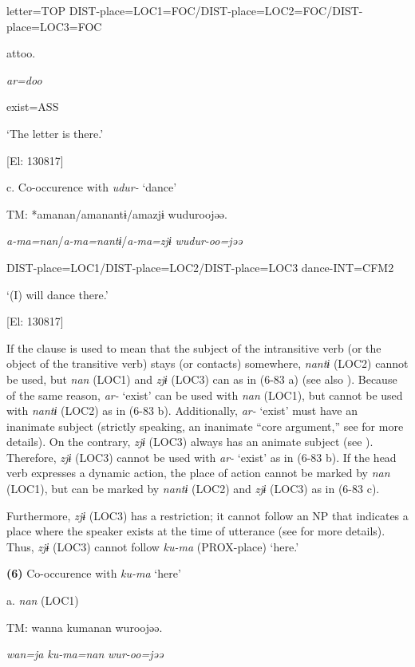     letter=TOP  DIST-place=LOC1=FOC/DIST-place=LOC2=FOC/DIST-place=LOC3=FOC

    attoo.  

    \textit{ar=doo}  

    exist=ASS  

    ‘The letter is there.’

    [El: 130817]

  c. Co-occurence with \textit{udur-} ‘dance’

  TM:  *amanan/amanantɨ/amazjɨ  wuduroojəə.

    \textit{a-ma=nan}/\textit{a-ma=nantɨ}/\textit{a-ma=zjɨ}  \textit{wudur-oo=jəə}

    DIST-place=LOC1/DIST-place=LOC2/DIST-place=LOC3  dance-INT=CFM2

     ‘(I) will dance there.’

    [El: 130817]

If the clause is used to mean that the subject of the intransitive verb (or the object of the transitive verb) stays (or contacts) somewhere, \textit{nantɨ} (LOC2) cannot be used, but \textit{nan} (LOC1) and \textit{zjɨ} (LOC3) can as in (6-83 a) (see also ). Because of the same reason, \textit{ar-} ‘exist’ can be used with \textit{nan} (LOC1), but cannot be used with \textit{nantɨ} (LOC2) as in (6-83 b). Additionally, \textit{ar-} ‘exist’ must have an inanimate subject (strictly speaking, an inanimate “core argument,” see  for more details). On the contrary, \textit{zjɨ} (LOC3) always has an animate subject (see ). Therefore, \textit{zjɨ} (LOC3) cannot be used with \textit{ar-} ‘exist’ as in (6-83 b). If the head verb expresses a dynamic action, the place of action cannot be marked by \textit{nan} (LOC1), but can be marked by \textit{nantɨ} (LOC2) and \textit{zjɨ} (LOC3) as in (6-83 c).

  Furthermore, \textit{zjɨ} (LOC3) has a restriction; it cannot follow an NP that indicates a place where the speaker exists at the time of utterance (see  for more details). Thus, \textit{zjɨ} (LOC3) cannot follow \textit{ku-ma} (PROX-place) ‘here.’

\textbf{(6)}  Co-occurence with \textit{ku-ma} ‘here’

  a.  \textit{nan} (LOC1)

    TM:  wanna  kumanan  wuroojəə.

      \textit{wan=ja}  \textit{ku-ma=nan}  \textit{wur-oo=jəə}

